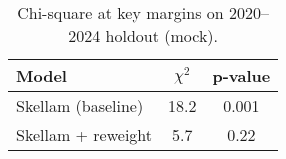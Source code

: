 \begin{table}[t]
  \centering
  \small
  \caption{Chi-square at key margins on 2020--2024 holdout (mock).}
  \begin{tabular}{lcc}
    \toprule
    Model & $\chi^2$ & p-value \\
    \midrule
    Skellam (baseline) & 18.2 & 0.001 \\
    Skellam + reweight & 5.7 & 0.22 \\
    \bottomrule
  \end{tabular}
\end{table}
